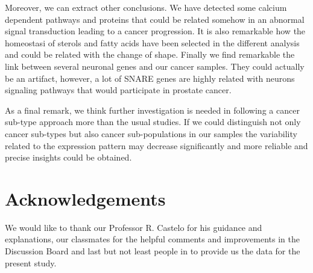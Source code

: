 \documentclass[9pt,twocolumn,twoside]{gsajnl}
\begin{document}
Moreover, we can extract other conclusions. We have detected some calcium dependent pathways and proteins that could be related somehow in an abnormal signal transduction leading to a cancer progression. It is also remarkable how the homeostasi of sterols and fatty acids have been selected in the different analysis and could be related with the change of shape. Finally we find remarkable the link between several neuronal genes and our cancer samples. They could actually be an artifact, however, a lot of SNARE genes are highly related with neurons signaling pathways that would participate in prostate cancer. 

As a final remark, we think further investigation is needed in following a cancer sub-type approach more than the usual studies. If we could distinguish not only cancer sub-types but also cancer sub-populations in our samples the variability related to the expression pattern may decrease significantly and more reliable and precise insights could be obtained.

\section*{Acknowledgements}

We would like to thank our Professor R. Castelo for his guidance and explanations, our classmates for the helpful comments and improvements in the Discussion Board and last but not least people in \cite{Rahman15112015} to provide us the data for the present study. 


\end{document}
